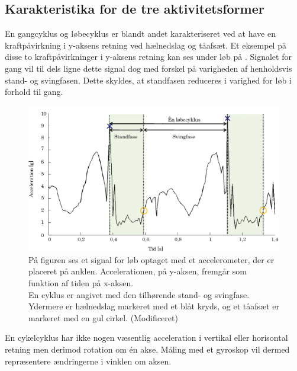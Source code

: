 \subsection{Karakteristika for de tre aktivitetsformer}
En gangcyklus og løbecyklus er blandt andet karakteriseret ved at have en kraftpåvirkning i y-aksens retning ved hælnedslag og tåafsæt. Et eksempel på disse to kraftpåvirkninger i y-aksens retning kan ses under løb på . Signalet for gang vil til dels ligne dette signal dog med forskel på varigheden af henholdsvis stand- og svingfasen. Dette skyldes, at standfasen reduceres i varighed for løb i forhold til gang. %
\begin{figure}[H]
	\centering
	\includegraphics[scale=0.55]{figures/bProblemloesning/loeb_skolebog.png}
	\caption{På figuren ses et signal for løb optaget med et accelerometer, der er placeret på anklen. Accelerationen, på y-aksen, fremgår som funktion af tiden på x-aksen. \\
En cyklus er angivet med den tilhørende stand- og svingfase. Ydermere er hælnedslag markeret med et blåt kryds, og et tåafsæt er markeret med en gul cirkel. \citep{WeyandKelly2001} (Modificeret)}
	\label{fig:loeb_skolebog}
\end{figure}
En cykelcyklus har ikke nogen væsentlig acceleration i vertikal eller horisontal retning men derimod rotation om én akse. Måling med et gyroskop vil dermed repræsentere ændringerne i vinklen om aksen. \citep{Cockcroft2011,Marin-PerianuMarin-Perianu2013}


